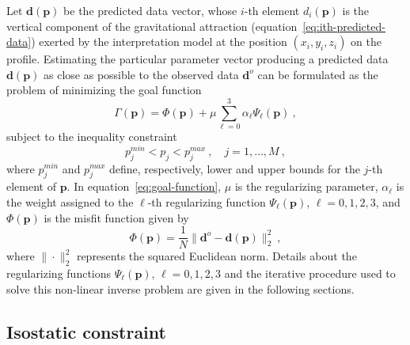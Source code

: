 \documentclass[manuscript]{geophysics}
\begin{document}
Let $\mathbf{d}(\mathbf{p})$ be the predicted data vector, whose $i$-th element
$d_{i}(\mathbf{p})$ is the vertical component of the gravitational attraction
(equation~\ref{eq:ith-predicted-data}) exerted by the interpretation model
at the position $(x_{i}, y_{i}, z_{i})$ on the profile.
Estimating the particular parameter vector producing a predicted data
$\mathbf{d}(\mathbf{p})$ as close as possible to the observed data 
$\mathbf{d}^{o}$ can be formulated as the problem of minimizing the goal function
\begin{equation}
\Gamma (\mathbf{p}) = \Phi(\mathbf{p}) + \mu \sum_{\ell = 0}^{3} \alpha_{\ell}
\Psi_{\ell}(\mathbf{p}) \: ,
\label{eq:goal-function}
\end{equation}
subject to the inequality constraint 
\begin{equation}
p_{j}^{min} < p_{j} < p_{j}^{max} \: , \quad j = 1, \dots, M \: ,
\label{eq:inequality-constraint}
\end{equation}
where $p_{j}^{min}$ and $p_{j}^{max}$ define, respectively, lower and upper bounds 
for the $j$-th element of $\mathbf{p}$.
In equation~\ref{eq:goal-function}, $\mu$ is the regularizing parameter,
$\alpha_{\ell}$ is the weight assigned to the $\ell$-th regularizing function $\Psi_{\ell}(\mathbf{p})$, $\ell = 0, 1, 2, 3$, and $\Phi(\mathbf{p})$ is the misfit
function given by
\begin{equation}
\Phi(\mathbf{p}) = \frac{1}{N} \| \mathbf{d}^{o} - \mathbf{d}(\mathbf{p}) \|_{2}^{2} 
\: , 
\label{eq:misfit-function}
\end{equation}
where $\| \cdot \|_{2}^{2}$ represents the squared Euclidean norm. Details about the 
regularizing functions $\Psi_{\ell}(\mathbf{p})$, $\ell = 0, 1, 2, 3$ and the 
iterative procedure used to solve this non-linear inverse problem are given in the 
following sections.


\subsection{Isostatic constraint}
\end{document}
